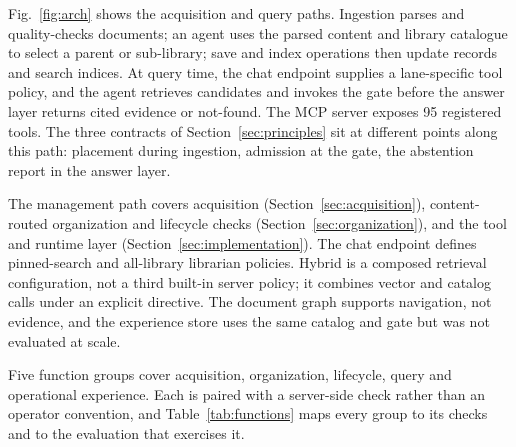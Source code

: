 Fig.~\ref{fig:arch} shows the acquisition and query paths. Ingestion parses and
quality-checks documents; an agent uses the parsed content and library
catalogue to select a parent or sub-library; save and index operations then
update records and search indices. At query time, the chat endpoint supplies a
lane-specific tool policy, and the agent retrieves candidates and invokes the
gate before the answer layer returns cited evidence or not-found. The MCP
server exposes 95 registered tools. The three contracts of
Section~\ref{sec:principles} sit at different points along this path:
placement during ingestion, admission at the gate, the abstention report in
the answer layer.

The management path covers acquisition (Section~\ref{sec:acquisition}),
content-routed organization and lifecycle checks
(Section~\ref{sec:organization}), and the tool and runtime layer
(Section~\ref{sec:implementation}). The chat
endpoint defines pinned-search and all-library librarian policies. Hybrid is
a composed retrieval configuration, not a third built-in server policy; it
combines vector and catalog calls under an explicit directive. The document
graph supports navigation, not evidence, and the experience store uses the
same catalog and gate but was not evaluated at scale.

Five function groups cover acquisition, organization, lifecycle, query and
operational experience. Each is paired with a server-side check rather than an
operator convention, and Table~\ref{tab:functions} maps every group to its
checks and to the evaluation that exercises it.

